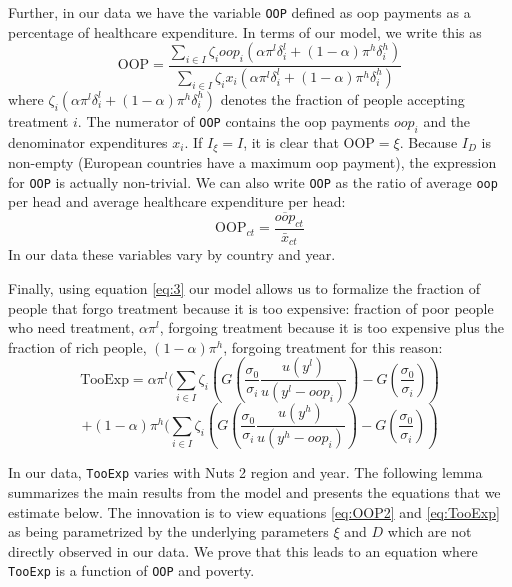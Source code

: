 \documentclass[a4paper,12pt]{article}
\begin{document}
Further, in our data we have the variable \texttt{OOP}  defined as oop payments as a percentage of healthcare expenditure. In terms of our model, we write this as
\begin{equation}
\label{eq:OOP}
\text{OOP} = \frac{\sum_{i \in I} \zeta_i oop_i (\alpha \pi^l \delta^l_i + (1-\alpha) \pi^h \delta^h_i)}{\sum_{i \in I} \zeta_i x_i (\alpha \pi^l \delta_i^l + (1-\alpha) \pi^h \delta_i^h) }
\end{equation}
where \(\zeta_i (\alpha \pi^l \delta^l_i + (1-\alpha) \pi^h \delta^h_i)\) denotes the fraction of people accepting treatment \(i\). The numerator of \texttt{OOP} contains the oop payments \(oop_{i}\) and the denominator expenditures \(x_i\). If \(I_{\xi} = I\), it is clear that \(\text{OOP} = \xi\). Because \(I_D\) is non-empty (European countries have a maximum oop payment), the expression for \texttt{OOP} is actually non-trivial. We can also write \texttt{OOP} as the ratio of average \texttt{oop} per head and average healthcare expenditure per head:
\begin{equation}
\label{eq:OOP2}
\text{OOP}_{ct} = \frac{\overline{oop}_{ct}}{\bar{x}_{ct}}
\end{equation}
In our data these variables vary by country and year.

Finally, using equation \eqref{eq:3} our model allows us to formalize the fraction of people that forgo treatment because it is too expensive: fraction of poor people who need treatment, \(\alpha \pi^l\), forgoing treatment because it is too expensive plus the fraction of rich people, \((1-\alpha)\pi^h\), forgoing treatment for this reason:
\begin{equation}
\label{eq:TooExp}
\text{TooExp} = \alpha \pi^l (\sum_{i \in I}\zeta_{i} \left(G\left( \frac{\sigma_0}{\sigma_i} \frac{u(y^{l})}{u(y^{l}-oop_{i})} \right) - G\left( \frac{\sigma_0}{\sigma_i} \right) \right )
\end{equation}
\begin{equation*}
 + (1-\alpha) \pi^h (\sum_{i \in I}\zeta_{i} \left(G\left( \frac{\sigma_0}{\sigma_i} \frac{u(y^{h})}{u(y^{h}-oop_{i})} \right) - G\left( \frac{\sigma_0}{\sigma_i} \right) \right )
\end{equation*}

In our data, \texttt{TooExp} varies with Nuts 2 region and year. The following lemma summarizes the main results from the model and presents the equations that we estimate below. The innovation is to view equations \eqref{eq:OOP2} and \eqref{eq:TooExp} as being parametrized by the underlying parameters \(\xi\) and \(D\) which are not directly observed in our data. We prove that this leads to an equation where \texttt{TooExp} is a function of \texttt{OOP} and poverty.
\end{document}
